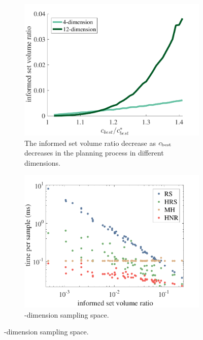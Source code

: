 \documentclass[letterpaper, 10 pt, conference]{ieeeconf}  %
\begin{document}
\begin{figure}[t!]
	\centering
	\begin{subfigure}[t!]{0.325\textwidth}
		\centering
		\includegraphics[width=\textwidth]{fig/sampling_efficiency/levelset}
		\caption{\captionstyle The informed set volume ratio decrease as $ c_{\rm best} $ decreases in the planning process in different dimensions.}
		\label{fig:sampling_efficiency:levelset}
	\end{subfigure}
	\begin{subfigure}[t!]{0.325\textwidth}
		\centering
		\includegraphics[width=\linewidth]{fig/sampling_efficiency/sample_efficiency_2d}
		\caption{-dimension sampling space.}
		\label{fig:sampling_efficiency:2d}

\end{subfigure}
\end{figure}
\end{document}
